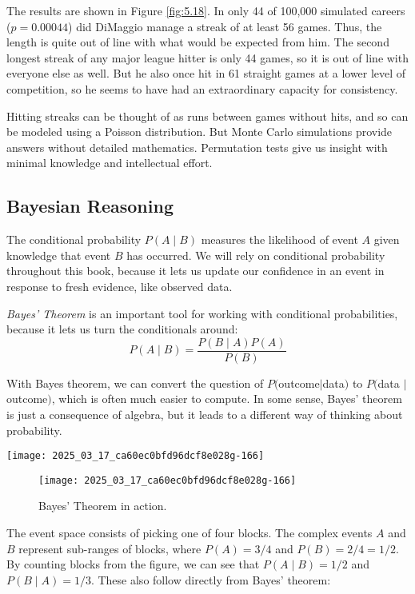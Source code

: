 \documentclass[10pt]{article}
\begin{document}
The results are shown in Figure \ref{fig:5.18}. In only 44 of 100,000 simulated careers ($p = 0.00044$) did DiMaggio manage a streak of at least 56 games. Thus, the length is quite out of line with what would be expected from him. The second longest streak of any major league hitter is only 44 games, so it is out of line with everyone else as well. But he also once hit in 61 straight games at a lower level of competition, so he seems to have had an extraordinary capacity for consistency.

Hitting streaks can be thought of as runs between games without hits, and so can be modeled using a Poisson distribution. But Monte Carlo simulations provide answers without detailed mathematics. Permutation tests give us insight with minimal knowledge and intellectual effort.

\subsection{Bayesian Reasoning}
The conditional probability $P(A \mid B)$ measures the likelihood of event $A$ given knowledge that event $B$ has occurred. We will rely on conditional probability throughout this book, because it lets us update our confidence in an event in response to fresh evidence, like observed data.

\textit{Bayes' Theorem} is an important tool for working with conditional probabilities, because it lets us turn the conditionals around:
\[
P(A \mid B) = \frac{P(B \mid A) P(A)}{P(B)}
\]

With Bayes theorem, we can convert the question of $P($outcome$\mid$data$)$ to $P($data $\mid$ outcome$)$, which is often much easier to compute. In some sense, Bayes’ theorem is just a consequence of algebra, but it leads to a different way of thinking about probability.

\texttt{[image: 2025\_03\_17\_ca60ec0bfd96dcf8e028g-166]}

\begin{figure}[H]
\centering
\texttt{[image: 2025\_03\_17\_ca60ec0bfd96dcf8e028g-166]}
\caption{Bayes' Theorem in action.}
\end{figure}

The event space consists of picking one of four blocks. The complex events $A$ and $B$ represent sub-ranges of blocks, where $P(A) = 3 / 4$ and $P(B) = 2 / 4 = 1/2$. By counting blocks from the figure, we can see that $P(A \mid B) = 1 / 2$ and $P(B \mid A) = 1 / 3$. These also follow directly from Bayes’ theorem:
\end{document}
